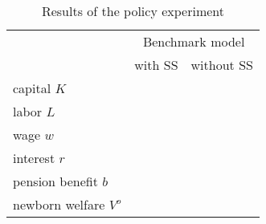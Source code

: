 \documentclass[10pt,a4paper]{article}
\begin{document}
\begin{table}[h]
\centering
\begin{tabular}{|l|c|c|}
\hline
 & \multicolumn{2}{c|}{Benchmark model} \\
\cline{2-3}
 & with SS & without SS \\
\hline
capital $K$ & & \\
\hline
labor $L$ & & \\
\hline
wage $w$ & & \\
\hline
interest $r$ & & \\
\hline
pension benefit $b$ & & \\
\hline
newborn welfare $V^o$ & & \\
\hline
\end{tabular}
\caption{Results of the policy experiment}
\end{table}
\end{document}

